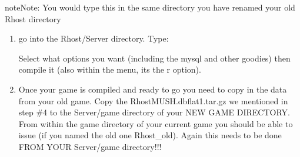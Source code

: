 \documentclass[letterpaper,10pt,english]{sphinxmanual}
\begin{document}
\begin{sphinxadmonition}{note}{Note:}
\sphinxAtStartPar
You would type this in the same directory you have renamed your old \textquotesingle{}Rhost\textquotesingle{} directory
\end{sphinxadmonition}
\begin{enumerate}
%
\setcounter{enumi}{6}
\item {} 
\sphinxAtStartPar
go into the Rhost/Server directory.   Type:

\begin{sphinxVerbatim}[commandchars=\\\{\}]
 
\end{sphinxVerbatim}

\sphinxAtStartPar
Select what options you want (including the mysql and other goodies) then compile it (also within the menu, it\textquotesingle{}s the \textquotesingle{}r\textquotesingle{} option).

\item {} 
\sphinxAtStartPar
Once your game is compiled and ready to go you need to copy in the data from your old game.  Copy the RhostMUSH.dbflat1.tar.gz we mentioned in step \#4 to the Server/game directory of your NEW GAME DIRECTORY.  From within the \textquotesingle{}game\textquotesingle{} directory of your current game you should be able to issue (if you named the old one Rhost\_old). Again this needs to be done FROM YOUR Server/game directory!!!

\end{enumerate}
\end{document}
